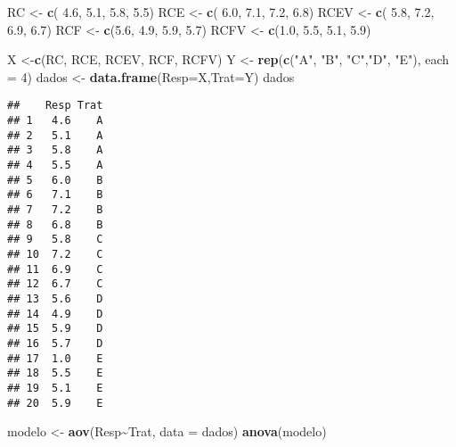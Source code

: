 \documentclass[
]{article}
\newenvironment{Shaded}{\begin{snugshade}}{\end{snugshade}}
\newcommand{\AttributeTok}[1]{\textcolor[rgb]{0.13,0.29,0.53}{#1}}
\newcommand{\DecValTok}[1]{\textcolor[rgb]{0.00,0.00,0.81}{#1}}
\newcommand{\FloatTok}[1]{\textcolor[rgb]{0.00,0.00,0.81}{#1}}
\newcommand{\FunctionTok}[1]{\textcolor[rgb]{0.13,0.29,0.53}{\textbf{#1}}}
\newcommand{\NormalTok}[1]{#1}
\newcommand{\OtherTok}[1]{\textcolor[rgb]{0.56,0.35,0.01}{#1}}
\newcommand{\SpecialCharTok}[1]{\textcolor[rgb]{0.81,0.36,0.00}{\textbf{#1}}}
\newcommand{\StringTok}[1]{\textcolor[rgb]{0.31,0.60,0.02}{#1}}
\begin{document}
\begin{Shaded}
\begin{Highlighting}[]
\NormalTok{RC }\OtherTok{\textless{}{-}} \FunctionTok{c}\NormalTok{( }\FloatTok{4.6}\NormalTok{, }\FloatTok{5.1}\NormalTok{, }\FloatTok{5.8}\NormalTok{, }\FloatTok{5.5}\NormalTok{)}
\NormalTok{RCE }\OtherTok{\textless{}{-}} \FunctionTok{c}\NormalTok{( }\FloatTok{6.0}\NormalTok{, }\FloatTok{7.1}\NormalTok{, }\FloatTok{7.2}\NormalTok{, }\FloatTok{6.8}\NormalTok{)}
\NormalTok{RCEV }\OtherTok{\textless{}{-}} \FunctionTok{c}\NormalTok{( }\FloatTok{5.8}\NormalTok{, }\FloatTok{7.2}\NormalTok{, }\FloatTok{6.9}\NormalTok{, }\FloatTok{6.7}\NormalTok{)}
\NormalTok{RCF }\OtherTok{\textless{}{-}} \FunctionTok{c}\NormalTok{(}\FloatTok{5.6}\NormalTok{, }\FloatTok{4.9}\NormalTok{, }\FloatTok{5.9}\NormalTok{, }\FloatTok{5.7}\NormalTok{)}
\NormalTok{RCFV }\OtherTok{\textless{}{-}} \FunctionTok{c}\NormalTok{(}\FloatTok{1.0}\NormalTok{, }\FloatTok{5.5}\NormalTok{, }\FloatTok{5.1}\NormalTok{, }\FloatTok{5.9}\NormalTok{)}

\NormalTok{X }\OtherTok{\textless{}{-}}\FunctionTok{c}\NormalTok{(RC, RCE, RCEV, RCF, RCFV)}
\NormalTok{Y }\OtherTok{\textless{}{-}} \FunctionTok{rep}\NormalTok{(}\FunctionTok{c}\NormalTok{(}\StringTok{"A"}\NormalTok{, }\StringTok{"B"}\NormalTok{, }\StringTok{"C"}\NormalTok{,}\StringTok{"D"}\NormalTok{, }\StringTok{"E"}\NormalTok{), }\AttributeTok{each =} \DecValTok{4}\NormalTok{)}
\NormalTok{dados }\OtherTok{\textless{}{-}} \FunctionTok{data.frame}\NormalTok{(}\AttributeTok{Resp=}\NormalTok{X,}\AttributeTok{Trat=}\NormalTok{Y)}
\NormalTok{dados}
\end{Highlighting}
\end{Shaded}

\begin{verbatim}
##    Resp Trat
## 1   4.6    A
## 2   5.1    A
## 3   5.8    A
## 4   5.5    A
## 5   6.0    B
## 6   7.1    B
## 7   7.2    B
## 8   6.8    B
## 9   5.8    C
## 10  7.2    C
## 11  6.9    C
## 12  6.7    C
## 13  5.6    D
## 14  4.9    D
## 15  5.9    D
## 16  5.7    D
## 17  1.0    E
## 18  5.5    E
## 19  5.1    E
## 20  5.9    E
\end{verbatim}

\begin{Shaded}
\begin{Highlighting}[]
\NormalTok{modelo }\OtherTok{\textless{}{-}} \FunctionTok{aov}\NormalTok{(Resp}\SpecialCharTok{\textasciitilde{}}\NormalTok{Trat, }\AttributeTok{data =}\NormalTok{ dados)}
\FunctionTok{anova}\NormalTok{(modelo) }
\end{Highlighting}
\end{Shaded}
\end{document}
